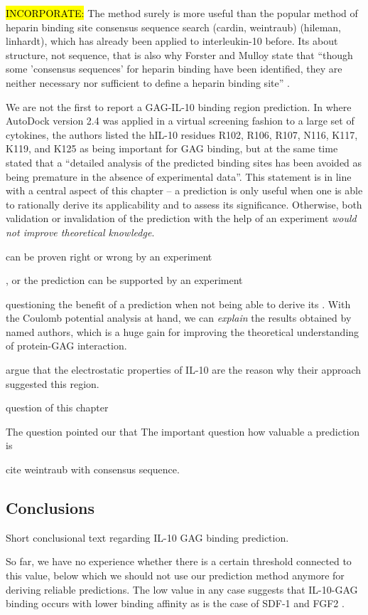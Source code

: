 \hl{INCORPORATE:} The method surely is more useful than the popular method of
heparin binding site consensus sequence search (cardin, weintraub) (hileman,
linhardt), which has already been applied to interleukin-10 before. Its about
structure, not sequence, that is also why Forster and Mulloy state that
\enquote{though some 'consensus sequences' for heparin binding have been
identified, they are neither necessary nor sufficient to define a heparin
binding site} \cite{hp_binding_sites_mulloy_2006}.

We are not the first to report a GAG-IL-10 binding region prediction. In
\cite{mulloy_forster_2008_4helixcytokines} where AutoDock version 2.4
\cite{autodock24} was applied in a virtual screening fashion to a large set of
cytokines, the authors listed the hIL-10 residues R102, R106, R107, N116, K117,
K119, and K125 as being important for GAG binding, but at the same time stated
that a \enquote{detailed analysis of the predicted binding sites has been
avoided as being premature in the absence of experimental data}. This statement
is in line with a central aspect of this chapter -- a prediction is only useful
when one is able to rationally derive its applicability and to assess its
significance. Otherwise, both validation or invalidation of the prediction with
the help of an experiment \textit{would not improve theoretical knowledge}.





 can be proven right or wrong by an
experiment

, or the prediction can be supported by
an experiment

questioning the benefit of a prediction when not being able to
derive its . With the Coulomb
potential analysis at hand, we can \textit{explain} the results obtained by
named authors, which is a huge gain for improving the theoretical understanding
of protein-GAG interaction.


argue that the electrostatic properties of IL-10 are the reason why their approach suggested
this region.





question of this chapter


The question
pointed our that The important
question how valuable a prediction is



cite weintraub with consensus sequence.





\subsection{Conclusions}
Short conclusional text regarding IL-10 GAG binding prediction.

 So far, we have no experience whether
there is a certain threshold connected to this value, below which we should not use our prediction method anymore for deriving reliable predictions.
The low value in any case suggests that IL-10-GAG binding occurs with lower
binding affinity as is the case of  SDF-1 and FGF2 .


